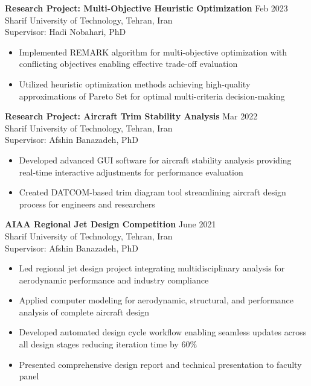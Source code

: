 \documentclass[12pt]{article}
\begin{document}
\vspace{4pt}

\noindent
\textbf{Research Project: Multi-Objective Heuristic Optimization} \hfill Feb 2023 \\
Sharif University of Technology, Tehran, Iran \\
Supervisor: Hadi Nobahari, PhD

\begin{itemize} \itemsep 1pt
	\item Implemented REMARK algorithm for multi-objective optimization with conflicting objectives enabling effective trade-off evaluation
	\item Utilized heuristic optimization methods achieving high-quality approximations of Pareto Set for optimal multi-criteria decision-making
\end{itemize}

\vspace{4pt}

\noindent
\textbf{Research Project: Aircraft Trim Stability Analysis} \hfill Mar 2022 \\
Sharif University of Technology, Tehran, Iran \\
Supervisor: Afshin Banazadeh, PhD

\begin{itemize} \itemsep 1pt
	\item Developed advanced GUI software for aircraft stability analysis providing real-time interactive adjustments for performance evaluation
	\item Created DATCOM-based trim diagram tool streamlining aircraft design process for engineers and researchers
\end{itemize}

\vspace{4pt}

\noindent
\textbf{AIAA Regional Jet Design Competition} \hfill June 2021 \\
Sharif University of Technology, Tehran, Iran \\
Supervisor: Afshin Banazadeh, PhD

\begin{itemize} \itemsep 1pt
	\item Led regional jet design project integrating multidisciplinary analysis for aerodynamic performance and industry compliance
	\item Applied computer modeling for aerodynamic, structural, and performance analysis of complete aircraft design
	\item Developed automated design cycle workflow enabling seamless updates across all design stages reducing iteration time by 60\%
	\item Presented comprehensive design report and technical presentation to faculty panel
\end{itemize}
\end{document}
